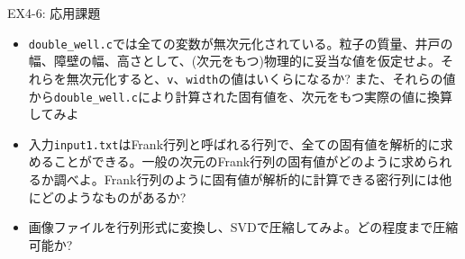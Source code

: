 \documentclass[dvipdfmx]{beamer}
\begin{document}
\begin{frame}[t,fragile]{EX4-6: 応用課題}
  \begin{itemize}
  \item[4-6-1] {\tt double\_well.c}では全ての変数が無次元化されている。粒子の質量、井戸の幅、障壁の幅、高さとして、(次元をもつ)物理的に妥当な値を仮定せよ。それらを無次元化すると、{\tt v}、{\tt width}の値はいくらになるか? また、それらの値から{\tt double\_well.c}により計算された固有値を、次元をもつ実際の値に換算してみよ
  \item[4-6-2] 入力{\tt input1.txt}はFrank行列と呼ばれる行列で、全ての固有値を解析的に求めることができる。一般の次元のFrank行列の固有値がどのように求められるか調べよ。Frank行列のように固有値が解析的に計算できる密行列には他にどのようなものがあるか?
  \item[4-6-3] 画像ファイルを行列形式に変換し、SVDで圧縮してみよ。どの程度まで圧縮可能か?
  \end{itemize}
\end{frame}
\end{document}
